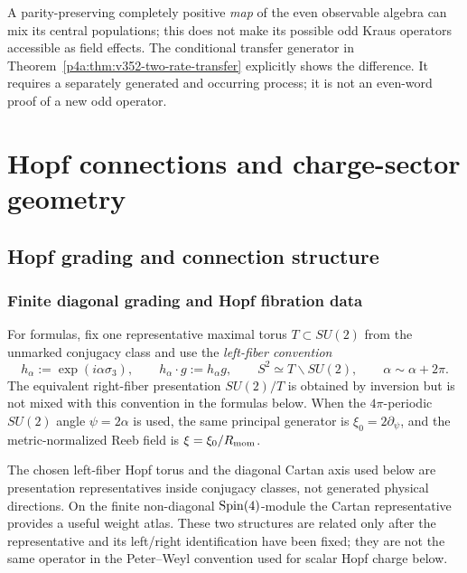 \documentclass[12pt,a4paper]{article}
\begin{document}
\begin{remark}
\label{p2d:rem:v352-process-not-event}
A parity-preserving completely positive \emph{map} of the even
observable algebra can mix its central populations; this does not
make its possible odd Kraus operators accessible as field effects.
The conditional transfer generator in
Theorem~\ref{p4a:thm:v352-two-rate-transfer} explicitly shows the
difference.  It requires a separately generated and occurring
process; it is not an even-word proof of a new odd operator.
\end{remark}


\section{Hopf connections and charge-sector geometry}
\label{paper2d:sec:organized-hopf}

\subsection{Hopf grading and connection structure}
\subsubsection{Finite diagonal grading and Hopf fibration data}
\label{p2:subsec:finite-diagonal-grading}

For formulas, fix one representative maximal torus \(T\subset SU(2)\) from
the unmarked conjugacy class and use the \emph{left-fiber convention}
\[
        h_\alpha:=\exp(i\alpha\sigma_3),
        \qquad
        h_\alpha\cdot g:=h_\alpha g,
        \qquad
        S^2\simeq T\backslash SU(2),
        \qquad
        \alpha\sim\alpha+2\pi .
\]
The equivalent right-fiber presentation \(SU(2)/T\) is obtained by inversion
but is not mixed with this convention in the formulas below.  When the
\(4\pi\)-periodic \(SU(2)\) angle \(\psi=2\alpha\) is used, the same
principal generator is
\(\xi_0=2\partial_\psi\), and the metric-normalized Reeb field is
\(\xi=\xi_0/R_{\mathrm{mom}}\).

The chosen left-fiber Hopf torus and the diagonal Cartan axis used below are
presentation representatives inside conjugacy classes, not generated physical
directions.  On the finite non-diagonal \(\mathrm{Spin}(4)\)-module the Cartan
representative provides a useful weight atlas.  These two structures are
related only after the representative and its left/right identification have
been fixed; they are not the same operator in the Peter--Weyl convention used
for scalar Hopf charge below.
\end{document}
